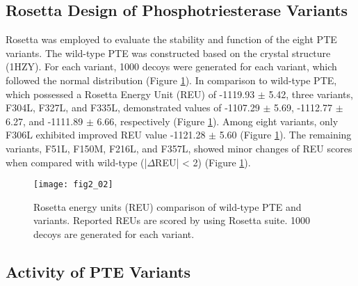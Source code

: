 \begin{refsection}
\subsection{Rosetta Design of Phosphotriesterase Variants}

Rosetta was employed to evaluate the stability and function of the eight PTE
variants. The wild-type PTE was constructed based on the crystal structure
(1HZY). For each variant, 1000 decoys were generated for each variant, which
followed the normal distribution (Figure \ref{fig:rosetta-box-plot}). In
comparison to wild-type PTE, which possessed a Rosetta Energy Unit (REU) of
-1119.93 $\pm$ 5.42, three variants, F304L, F327L, and F335L, demonstrated
values of -1107.29 $\pm$ 5.69, -1112.77 $\pm$ 6.27, and -1111.89 $\pm$ 6.66,
respectively (Figure \ref{fig:rosetta-box-plot}). Among eight variants, only
F306L exhibited improved REU value -1121.28 $\pm$ 5.60 (Figure
\ref{fig:rosetta-box-plot}). The remaining variants, F51L, F150M, F216L, and
F357L, showed minor changes of REU scores when compared with wild-type
(|$\Delta$REU| < 2) (Figure \ref{fig:rosetta-box-plot}).
\begin{figure}[htbp] \centering \texttt{[image: fig2\_02]}
    \caption[Rosetta energy units (REU) comparison of wild-type PTE and
    variants. Reported REUs are scored by using Rosetta suite. 1000 decoys are
generated for each variant.]{Rosetta energy units (REU) comparison of wild-type
PTE and variants. Reported REUs are scored by using Rosetta suite. 1000 decoys
are generated for each variant.}
    \label{fig:rosetta-box-plot}
\end{figure}

\subsection{Activity of PTE Variants}


\end{refsection}
